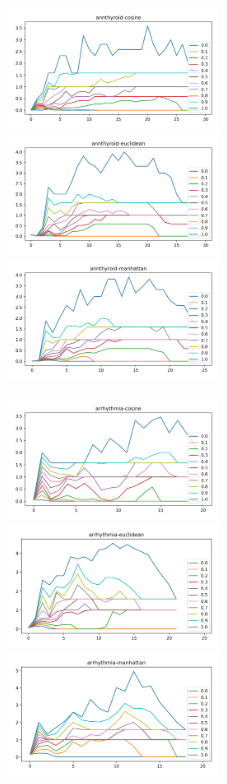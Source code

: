 \begin{figure}[!t]
\centering
\includegraphics[width=2.2in]{kdd/static/lfd_vs_depth/annthyroid-cosine.png}
\includegraphics[width=2.2in]{kdd/static/lfd_vs_depth/annthyroid-euclidean.png}
\includegraphics[width=2.2in]{kdd/static/lfd_vs_depth/annthyroid-manhattan.png}

\includegraphics[width=2.2in]{kdd/static/lfd_vs_depth/arrhythmia-cosine.png}
\includegraphics[width=2.2in]{kdd/static/lfd_vs_depth/arrhythmia-euclidean.png}
\includegraphics[width=2.2in]{kdd/static/lfd_vs_depth/arrhythmia-manhattan.png}


\end{figure}
